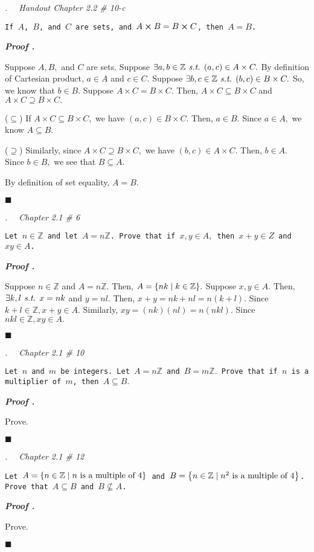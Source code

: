 \documentclass[11pt,letter]{article}
\newcounter{nq}[section]
\newcounter{np}[section]
\newenvironment*{p}{\par\noindent\textbf{\textit{Proof \stepcounter{np}\thenp. }}\par}{\par\hfill $\blacksquare$\par}
\newenvironment*{q}[1]{\noindent\emph{\thesection.\stepcounter{nq}\thenq$\quad $ #1}\par\noindent\texttt}{}
\def\Z{{\mathbb{Z}}}
\def\st{\emph{ s.t. }}
\begin{document}
\begin{framed}\begin{q}
	{Handout Chapter 2.2 \# 10-c}
	{If $A$, $B$, and $C$ are sets, and $A\cross B=B\cross C$, then $A=B$.}
\end{q}\end{framed}
\begin{p}
	Suppose $A,B,$ and $C$ are sets. Suppose $\exists a,b\in\Z\st(a,c)\in A\times C.$ By definition of Cartesian product, $a\in A$ and $c\in C.$ Suppose $\exists b,c\in\Z\st(b,c)\in B\times C.$ So, we know that $b\in B.$ Suppose $A\times C=B\times C.$ Then, $A\times C\subseteq B\times C$ and $A\times C\supseteq B\times C.$\par 
	($\subseteq$) If $A\times C\subseteq B\times C,$ we have $(a,c)\in B\times C.$ Then, $a\in B.$ Since $a\in A,$ we know $A\subseteq B.$\par 
	($\supseteq$) Similarly, since $A\times C\supseteq B\times C,$ we have $(b,c)\in A\times C.$ Then, $b\in A.$ Since $b\in B,$ we see that $B\subseteq A.$\par 
	By definition of set equality, $A=B.$
\end{p}

\begin{framed}\begin{q}
	{Chapter 2.1 \# 6}
	{Let $n\in\Z$ and let $A=n\Z$. Prove that if $x,y\in A,$ then $x+y\in Z$ and $xy\in A$.}
\end{q}\end{framed}
\begin{p}
	Suppose $n\in\Z$ and $A=n\Z.$ Then, $A=\qty{nk\mid k\in\Z}.$ Suppose $x,y\in A.$ Then, $\exists k,l\st x=nk$ and $y=nl.$ Then, $x+y=nk+nl=n(k+l).$ Since $k+l\in\Z, x+y\in A.$ Similarly, $xy=(nk)(nl)=n(nkl).$ Since $nkl\in\Z,xy\in A.$
\end{p}

\begin{framed}\begin{q}
	{Chapter 2.1 \# 10}
	{Let $n$ and $m$ be integers. Let $A=n\Z$ and $B=m\Z.$ Prove that if $n$ is a multiplier of $m$, then $A\subseteq B.$}
\end{q}\end{framed}
\begin{p}
	Prove.	
\end{p}

\begin{framed}\begin{q}
	{Chapter 2.1 \# 12}
	{Let $A=\qty{n\in\Z\mid n\text{ is a multiple of }4}$ and $B=\qty{n\in\Z\mid n^2\text{ is a multiple of }4}$. Prove that $A\subseteq B$ and $B\nsubseteq A$.}
\end{q}\end{framed}
\begin{p}
	Prove.	
\end{p}
\end{document}

